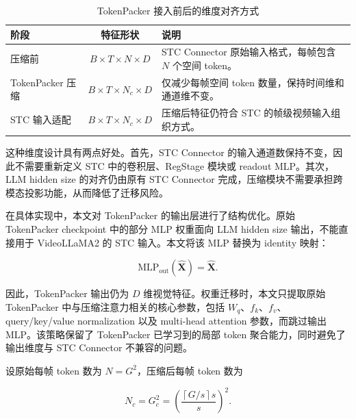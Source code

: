 \begin{table}[!htbp]
    \centering
    \caption{\label{tab:method-dimension-alignment}TokenPacker 接入前后的维度对齐方式}
    \begin{tabularx}{\textwidth}{l c X}
        \toprule
        阶段 & 特征形状 & 说明 \\
        \midrule
        压缩前 & $B\times T\times N\times D$ & STC Connector 原始输入格式，每帧包含 $N$ 个空间 token。 \\
        TokenPacker 压缩 & $B\times T\times N_c\times D$ & 仅减少每帧空间 token 数量，保持时间维和通道维不变。 \\
        STC 输入适配 & $B\times T\times N_c\times D$ & 压缩后特征仍符合 STC 的帧级视频输入组织方式。 \\
        \bottomrule
    \end{tabularx}
\end{table}

\par 这种维度设计具有两点好处。首先，STC Connector 的输入通道数保持不变，因此不需要重新定义 STC 中的卷积层、RegStage 模块或 readout MLP。其次，LLM hidden size 的对齐仍由原有 STC Connector 完成，压缩模块不需要承担跨模态投影功能，从而降低了迁移风险。

\par 在具体实现中，本文对 TokenPacker 的输出层进行了结构优化。原始 TokenPacker checkpoint 中的部分 MLP 权重面向 LLM hidden size 输出，不能直接用于 VideoLLaMA2 的 STC 输入。本文将该 MLP 替换为 identity 映射：

\begin{equation}
    \label{equ:method-identity-mlp}
    \mathrm{MLP}_{\mathrm{out}}(\hat{\mathbf{X}}) = \hat{\mathbf{X}}.
\end{equation}

\par 因此，TokenPacker 输出仍为 $D$ 维视觉特征。权重迁移时，本文只提取原始 TokenPacker 中与压缩注意力相关的核心参数，包括 $W_q$、$f_k$、$f_v$、query/key/value normalization 以及 multi-head attention 参数，而跳过输出 MLP。该策略保留了 TokenPacker 已学习到的局部 token 聚合能力，同时避免了输出维度与 STC Connector 不兼容的问题。

\par 设原始每帧 token 数为 $N=G^2$，压缩后每帧 token 数为

\begin{equation}
    \label{equ:method-compressed-token-count}
    N_c = G_c^2 =
    \left(\frac{\left\lceil G/s \right\rceil s}{s}\right)^2.
\end{equation}


